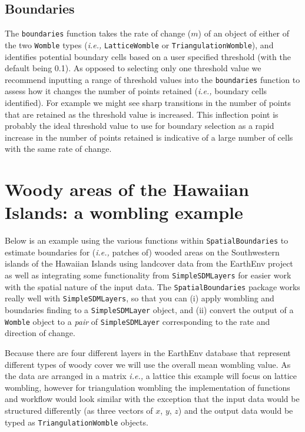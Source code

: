 \subsection{Boundaries}\label{boundaries}

The \texttt{boundaries} function takes the rate of change (\(m\)) of an
object of either of the two \texttt{Womble} types (\emph{i.e.,}
\texttt{LatticeWomble} or \texttt{TriangulationWomble}), and identifies
potential boundary cells based on a user specified threshold (with the
default being 0.1). As opposed to selecting only one threshold value we
recommend inputting a range of threshold values into the
\texttt{boundaries} function to assess how it changes the number of
points retained (\emph{i.e.,} boundary cells identified). For example we
might see sharp transitions in the number of points that are retained as
the threshold value is increased. This inflection point is probably the
ideal threshold value to use for boundary selection as a rapid increase
in the number of points retained is indicative of a large number of
cells with the same rate of change.

\section{Woody areas of the Hawaiian Islands: a wombling
example}\label{woody-areas-of-the-hawaiian-islands-a-wombling-example}

Below is an example using the various functions within
\texttt{SpatialBoundaries} to estimate boundaries for (\emph{i.e.,}
patches of) wooded areas on the Southwestern islands of the Hawaiian
Islands using landcover data from the EarthEnv project
\cite{Tuanmu2014Glo1km} as well as integrating some functionality from
\texttt{SimpleSDMLayers} \cite{Dansereau2021SimJl} for easier work with
the spatial nature of the input data. The \texttt{SpatialBoundaries}
package works really well with \texttt{SimpleSDMLayers}, so that you can
(i) apply wombling and boundaries finding to a \texttt{SimpleSDMLayer}
object, and (ii) convert the output of a \texttt{Womble} object to a
\emph{pair} of \texttt{SimpleSDMLayer} corresponding to the rate and
direction of change.

Because there are four different layers in the EarthEnv database that
represent different types of woody cover we will use the overall mean
wombling value. As the data are arranged in a matrix \emph{i.e.,} a
lattice this example will focus on lattice wombling, however for
triangulation wombling the implementation of functions and workflow
would look similar with the exception that the input data would be
structured differently (as three vectors of \(x\), \(y\), \(z\)) and the
output data would be typed as \texttt{TriangulationWomble} objects.

